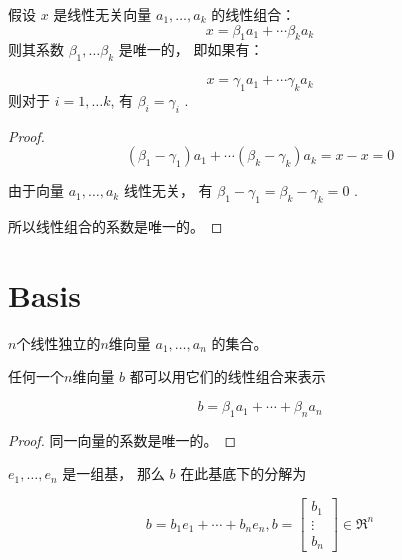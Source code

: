 \begin{theorem}
    假设 $ x $ 是线性无关向量 $ a_{1}, \ldots, a_{k} $ 的线性组合：
\begin{equation}
x=\beta_{1} a_{1}+\cdots \beta_{k} a_{k}
\end{equation}
则其系数 $ \beta_{1}, \ldots \beta_{k} $ 是唯一的， 即如果有：

\begin{equation}
x=\gamma_{1} a_{1}+\cdots \gamma_{k} a_{k}
\end{equation}
则对于 $ i=1, \ldots k $, 有 $ \beta_{i}=\gamma_{i} $ . 
\end{theorem}

\begin{proof}
\begin{equation}
\left(\beta_{1}-\gamma_{1}\right) a_{1}+\cdots\left(\beta_{k}-\gamma_{k}\right) a_{k}=x-x=0
\end{equation}

由于向量 $ a_{1}, \ldots, a_{k} $ 线性无关， 有 $ \beta_{1}-\gamma_{1}=\beta_{k}-\gamma_{k}=0 $ . 

所以线性组合的系数是唯一的。
\end{proof}

\section{Basis}

\begin{definition}[基 (Basis)]
    $n$个线性独立的$n$维向量 $ a_{1}, \ldots, a_{n} $ 的集合。
\end{definition}

\begin{definition}
    任何一个$n$维向量 $ b $ 都可以用它们的线性组合来表示

\begin{equation}
b=\beta_{1} a_{1}+\cdots+\beta_{n} a_{n}
\end{equation}
\end{definition}

\begin{proof}
    同一向量的系数是唯一的。 
\end{proof}

\begin{example}
    $ e_{1}, \ldots, e_{n} $ 是一组基， 那么 $ b $ 在此基底下的分解为

    \begin{equation} b=b_{1} e_{1}+\cdots+b_{n} e_{n} ,b=\left[\begin{array}{c}b_{1} \\ \vdots \\ b_{n}\end{array}\right] \in \mathfrak{R}^{n} \end{equation}
\end{example}

